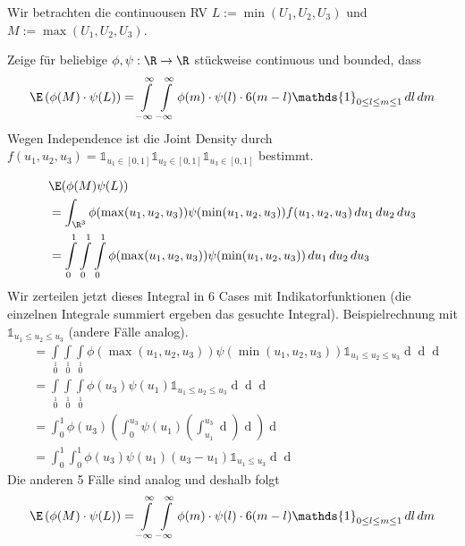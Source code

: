 Wir betrachten die continuousen RV $L := \min(U_1, U_2, U_3)$ und $M:=\max(U_1, U_2, U_3)$.

Zeige für beliebige $\phi, \psi: \R \to \R$ stückweise continuous und bounded, dass 
\[\E\left(\phi(M)\cdot\psi(L)\right) = \int\limits_{-\infty}\limits^\infty \int\limits_{-\infty}\limits^\infty \phi(m) \cdot \psi(l) \cdot6(m-l)\mathds{1}_{0\leq l\leq m \leq 1}\mathop{dl}\mathop{dm}\]
Wegen Independence ist die Joint Density durch $f(u_1, u_2, u_3) = \mathds{1}_{u_1 \in [0,1]}\mathds{1}_{u_2 \in [0,1]}\mathds{1}_{u_3 \in [0,1]}$ bestimmt.

\begin{align*}
	&\E(\phi(M)\psi(L)) \\
	&= \int_{\R^3} \phi(\max(u_1, u_2, u_3))\psi(\min(u_1, u_2, u_3)) f(u_1, u_2, u_3) \mathop{du_1}\mathop{du_2}\mathop{du_3}\\
	&= \int\limits_0\limits^1 \int\limits_0\limits^1 \int\limits_0\limits^1 \phi(\max(u_1, u_2, u_3))\psi(\min(u_1, u_2, u_3)) \mathop{du_1}\mathop{du_2}\mathop{du_3}
\end{align*}
Wir zerteilen jetzt dieses Integral in 6 Cases mit Indikatorfunktionen (die einzelnen Integrale summiert ergeben das gesuchte Integral). 
Beispielrechnung mit $\mathds{1}_{u_1 \leq u_2 \leq u_3}$ (andere Fälle analog).
\begin{align*}
	&= \int\limits_0\limits^1 \int\limits_0\limits^1 \int\limits_0\limits^1 \phi(\max(u_1, u_2, u_3))\psi(\min(u_1, u_2, u_3)) \mathds{1}_{u_1 \leq u_2 \leq u_3} \mathop{du_1}\mathop{du_2}\mathop{du_3}\\
	&= \int\limits_0\limits^1 \int\limits_0\limits^1 \int\limits_0\limits^1 \phi(u_3)\psi(u_1) \mathds{1}_{u_1 \leq u_2 \leq u_3} \mathop{du_1}\mathop{du_2}\mathop{du_3}\\
	&= \int_0^1 \phi(u_3) \left(\int_0^{u_3}\psi(u_1)\left(\int_{u_1}^{u_3}\mathop{du_2}\right)\mathop{du_1}\right)\mathop{du_3}\\
	&= \int_0^1\int_0^1 \phi(u_3)\psi(u_1)(u_3-u_1)\mathds{1}_{u_1\leq u_3}\mathop{du_1}\mathop{du_3}
\end{align*}
Die anderen 5 Fälle sind analog und deshalb folgt
\[\E\left(\phi(M)\cdot\psi(L)\right) = \int\limits_{-\infty}\limits^\infty \int\limits_{-\infty}\limits^\infty \phi(m) \cdot \psi(l) \cdot6(m-l)\mathds{1}_{0\leq l\leq m \leq 1}\mathop{dl}\mathop{dm}\]